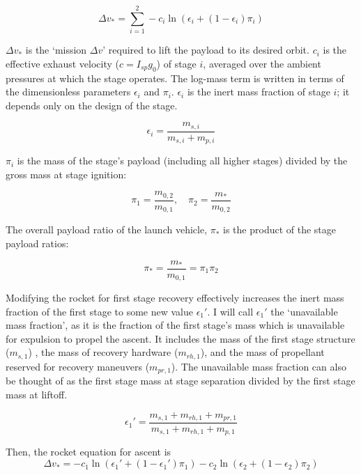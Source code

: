 \documentclass[conf]{new-aiaa}
\begin{document}
\begin{equation}
\Delta v_* =  \sum_{i=1}^{2} - c_i \ln\left( \epsilon_i + (1 - \epsilon_i) \pi_i \right)
\end{equation} 

$\Delta v_*$ is the `mission $\Delta v$' required to lift the payload to its desired orbit. $c_i$ is the effective exhaust velocity ($c = I_{sp} g_0$) of stage $i$, averaged over the ambient pressures at which the stage operates. The log-mass term is written in terms of the dimensionless parameters $\epsilon_i$ and $\pi_i$. $\epsilon_i$ is the inert mass fraction of stage $i$; it depends only on the design of the stage.

\begin{equation}
\epsilon_i = \frac{m_{s,i}}{m_{s,i} + m_{p,i}}
\end{equation}

$\pi_i$ is the mass of the stage's payload (including all higher stages) divided by the gross mass at stage ignition:

\begin{equation}
\pi_1 = \frac{m_{0,2}}{m_{0,1}}, \quad \pi_2 = \frac{m_*}{m_{0,2}}
\end{equation}

The overall payload ratio of the launch vehicle, $\pi_*$ is the product of the stage payload ratios:

\begin{equation}
\label{eq:pi_star}
\pi_* = \frac{m_*}{m_{0,1}} = \pi_1 \pi_2
\end{equation} 

Modifying the rocket for first stage recovery effectively increases the inert mass fraction of the first stage to some new value $\epsilon_1'$. I will call $\epsilon_1'$ the `unavailable mass fraction', as it is the fraction of the first stage's mass which is unavailable for expulsion to propel the ascent. It includes the mass of the first stage structure ($m_{s,1}$) , the mass of recovery hardware ($m_{rh,1}$), and the mass of propellant reserved for recovery maneuvers ($m_{pr,1}$). The unavailable mass fraction can also be thought of as the first stage mass at stage separation divided by the first stage mass at liftoff.

\begin{equation}
\label{eq:epsilon_1_prime}
\epsilon_1' = \frac{m_{s,1} + m_{rh,1} + m_{pr,1}}{m_{s,1} + m_{rh,1} + m_{p,1}}
\end{equation}

Then, the rocket equation for ascent is
\begin{equation}
\label{eq:recov_rocket}
\Delta v_* =  - c_1 \ln\left( \epsilon_1' + (1 - \epsilon_1') \pi_1 \right) - c_2 \ln\left( \epsilon_2 + (1 - \epsilon_2) \pi_2 \right)
\end{equation}
\end{document}

